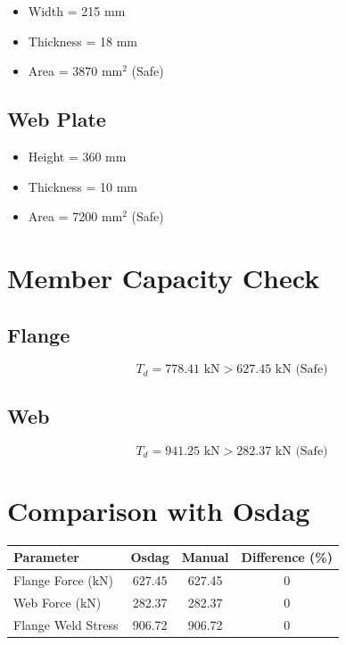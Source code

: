 \begin{itemize}
    \item Width = 215 mm
    \item Thickness = 18 mm
    \item Area = 3870 mm$^2$ (Safe)
\end{itemize}

\subsection{Web Plate}

\begin{itemize}
    \item Height = 360 mm
    \item Thickness = 10 mm
    \item Area = 7200 mm$^2$ (Safe)
\end{itemize}

\section{Member Capacity Check}

\subsection{Flange}

\begin{equation}
T_d = 778.41 \text{ kN} > 627.45 \text{ kN (Safe)}
\end{equation}

\subsection{Web}

\begin{equation}
T_d = 941.25 \text{ kN} > 282.37 \text{ kN (Safe)}
\end{equation}

\section{Comparison with Osdag}

\begin{center}
\begin{tabular}{lccc}
\toprule
Parameter & Osdag & Manual & Difference (\%) \\
\midrule
Flange Force (kN) & 627.45 & 627.45 & 0 \\
Web Force (kN) & 282.37 & 282.37 & 0 \\
Flange Weld Stress & 906.72 & 906.72 & 0 \\
\bottomrule
\end{tabular}
\end{center}

